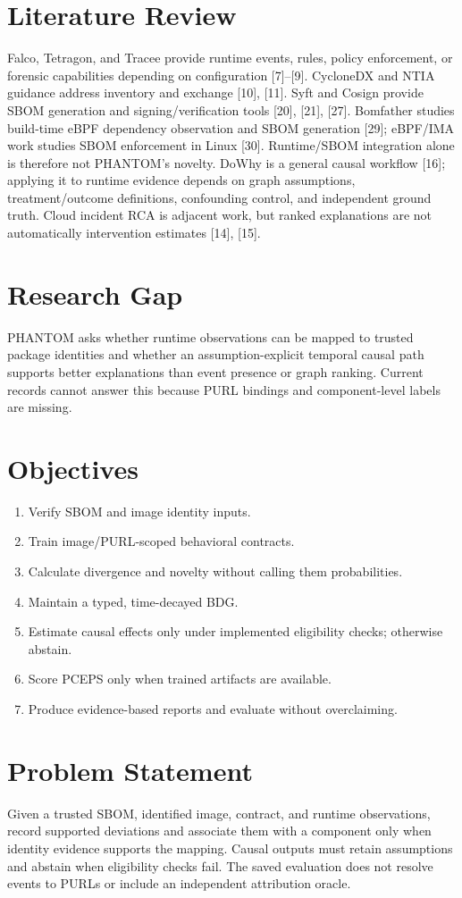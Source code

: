 \documentclass[12pt,a4paper,oneside]{report}
\begin{document}
\section{Literature Review}
Falco, Tetragon, and Tracee provide runtime events, rules, policy enforcement, or forensic capabilities depending on configuration [7]--[9]. CycloneDX and NTIA guidance address inventory and exchange [10], [11]. Syft and Cosign provide SBOM generation and signing/verification tools [20], [21], [27]. Bomfather studies build-time eBPF dependency observation and SBOM generation [29]; eBPF/IMA work studies SBOM enforcement in Linux [30]. Runtime/SBOM integration alone is therefore not PHANTOM's novelty. DoWhy is a general causal workflow [16]; applying it to runtime evidence depends on graph assumptions, treatment/outcome definitions, confounding control, and independent ground truth. Cloud incident RCA is adjacent work, but ranked explanations are not automatically intervention estimates [14], [15].
\section{Research Gap}
PHANTOM asks whether runtime observations can be mapped to trusted package identities and whether an assumption-explicit temporal causal path supports better explanations than event presence or graph ranking. Current records cannot answer this because PURL bindings and component-level labels are missing.
\section{Objectives}
\begin{enumerate}[leftmargin=*]\item Verify SBOM and image identity inputs.\item Train image/PURL-scoped behavioral contracts.\item Calculate divergence and novelty without calling them probabilities.\item Maintain a typed, time-decayed BDG.\item Estimate causal effects only under implemented eligibility checks; otherwise abstain.\item Score PCEPS only when trained artifacts are available.\item Produce evidence-based reports and evaluate without overclaiming.\end{enumerate}
\section{Problem Statement}
Given a trusted SBOM, identified image, contract, and runtime observations, record supported deviations and associate them with a component only when identity evidence supports the mapping. Causal outputs must retain assumptions and abstain when eligibility checks fail. The saved evaluation does not resolve events to PURLs or include an independent attribution oracle.
\end{document}
